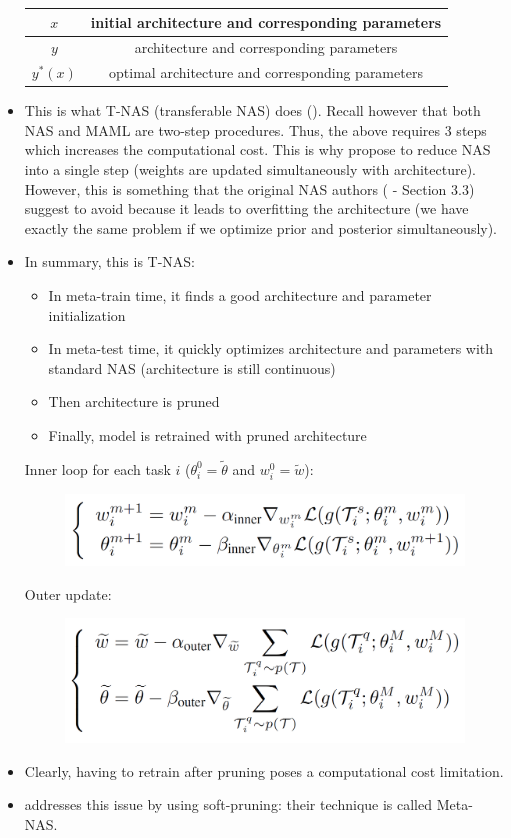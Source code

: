 \begin{itemize}
	\begin{center}
		\begin{tabular}{ | c || c |} 
			\hline
			$x$ & initial architecture and corresponding parameters \\
			\hline
			$y$ & architecture and corresponding parameters \\
			\hline
			$y^*(x)$ & optimal architecture and corresponding parameters \\
			\hline
		\end{tabular}
	\end{center}
	\item This is what T-NAS (transferable NAS) does (\cite{lian2019fast}).
	Recall however that both NAS and MAML are two-step procedures. 
	Thus, the above requires 3 steps which increases the computational cost.
	This is why \textcite{lian2019fast} propose to reduce NAS into a single step (weights are updated simultaneously with architecture). 
	However, this is something that the original NAS authors (\cite{liu2019darts} - Section 3.3) suggest to avoid because it leads to overfitting the architecture (we have exactly the same problem if we optimize prior and posterior simultaneously).
	\item In summary, this is T-NAS:
	\begin{itemize}
		\item In meta-train time, it finds a good architecture and parameter initialization
		\item In meta-test time, it quickly optimizes architecture and parameters with standard NAS (architecture is still continuous)
		\item Then architecture is pruned
		\item Finally, model is retrained with pruned architecture
	\end{itemize}
	Inner loop for each task $i$ ($\theta_i^0 = \tilde{\theta}$ and $w_i^0 = \tilde{w}$):
	\setlength{\belowcaptionskip}{-40pt}
	\begin{figure}[H]
		\centering
		\includegraphics[width=.55\linewidth]{./figs/meta_nas_inner.png}  
		\caption*{}
	\end{figure}
	Outer update:
	\begin{figure}[H]
		\centering
		\includegraphics[width=.5\linewidth]{./figs/meta_nas_outer.png}  
		\caption*{}
	\end{figure}
	\item Clearly, having to retrain after pruning poses a computational cost limitation.
	\item \textcite{elsken2020metalearning} addresses this issue by using soft-pruning: their technique is called Meta-NAS.

\end{itemize}

